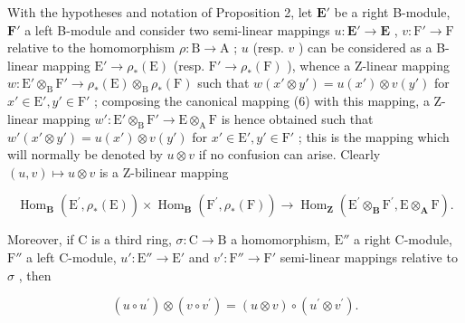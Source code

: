 With the hypotheses and notation of Proposition 2, let \(\mathbf{E}'\) be a right B-module, \(\mathbf{F}'\) a left B-module and consider two semi-linear mappings \(u: \mathbf{E}' \to \mathbf{E}\) , \(v: \mathrm{F}' \to \mathrm{F}\) relative to the homomorphism \(\rho: \mathrm{B} \to \mathrm{A}\) ; \(u\) (resp. \(v\) ) can be considered as a B-linear mapping \(\mathrm{E}' \to \rho_*(\mathrm{E})\) (resp. \(\mathrm{F}' \to \rho_*(\mathrm{F})\) ), whence a Z-linear mapping \(w: \mathrm{E}' \otimes_{\mathrm{B}} \mathrm{F}' \to \rho_*(\mathrm{E}) \otimes_{\mathrm{B}} \rho_*(\mathrm{F})\) such that \(w(x' \otimes y') = u(x') \otimes v(y')\) for \(x' \in \mathrm{E}', y' \in \mathrm{F}'\) ; composing the canonical mapping (6) with this mapping, a Z-linear mapping \(w': \mathrm{E}' \otimes_{\mathrm{B}} \mathrm{F}' \to \mathrm{E} \otimes_{\mathrm{A}} \mathrm{F}\) is hence obtained such that \(w'(x' \otimes y') = u(x') \otimes v(y')\) for \(x' \in \mathrm{E}', y' \in \mathrm{F}'\) ; this is the mapping which will normally be denoted by \(u \otimes v\) if no confusion can arise. Clearly \((u, v) \mapsto u \otimes v\) is a Z-bilinear mapping

\[
\operatorname{Hom} _ {\mathbf {B}} \left(\mathrm{E} ^ {\prime}, \rho_ {*} (\mathrm{E})\right) \times \operatorname{Hom} _ {\mathbf {B}} \left(\mathrm{F} ^ {\prime}, \rho_ {*} (\mathrm{F})\right)\rightarrow \operatorname{Hom} _ {\mathbf {Z}} \left(\mathrm{E} ^ {\prime} \otimes_ {\mathbf {B}} \mathrm{F} ^ {\prime}, \mathrm{E} \otimes_ {\mathbf {A}} \mathrm{F}\right).
\]

Moreover, if C is a third ring, \(\sigma: \mathrm{C} \to \mathrm{B}\) a homomorphism, \(\mathrm{E}''\) a right C-module, \(\mathrm{F}''\) a left C-module, \(u': \mathrm{E}'' \to \mathrm{E}'\) and \(v': \mathrm{F}'' \to \mathrm{F}'\) semi-linear mappings relative to \(\sigma\) , then

\[
(u \circ u ^ {\prime}) \otimes (v \circ v ^ {\prime}) = (u \otimes v) \circ (u ^ {\prime} \otimes v ^ {\prime}).
\]

